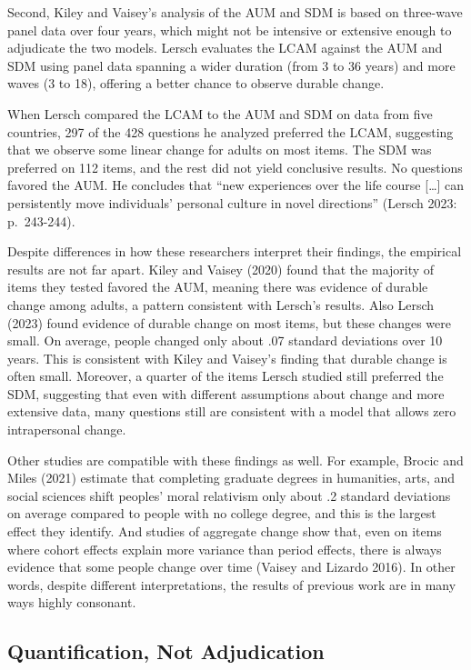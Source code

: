 \documentclass[
  12pt,
]{article}
\begin{document}
Second, Kiley and Vaisey's analysis of the AUM and SDM is based on
three-wave panel data over four years, which might not be intensive or
extensive enough to adjudicate the two models. Lersch evaluates the LCAM
against the AUM and SDM using panel data spanning a wider duration (from
3 to 36 years) and more waves (3 to 18), offering a better chance to
observe durable change.

When Lersch compared the LCAM to the AUM and SDM on data from five
countries, 297 of the 428 questions he analyzed preferred the LCAM,
suggesting that we observe some linear change for adults on most items.
The SDM was preferred on 112 items, and the rest did not yield
conclusive results. No questions favored the AUM. He concludes that
``new experiences over the life course {[}\ldots{]} can persistently
move individuals' personal culture in novel directions'' (Lersch 2023:
p.~243-244).

Despite differences in how these researchers interpret their findings,
the empirical results are not far apart. Kiley and Vaisey (2020) found
that the majority of items they tested favored the AUM, meaning there
was evidence of durable change among adults, a pattern consistent with
Lersch's results. Also Lersch (2023) found evidence of durable change on
most items, but these changes were small. On average, people changed
only about .07 standard deviations over 10 years. This is consistent
with Kiley and Vaisey's finding that durable change is often small.
Moreover, a quarter of the items Lersch studied still preferred the SDM,
suggesting that even with different assumptions about change and more
extensive data, many questions still are consistent with a model that
allows zero intrapersonal change.

Other studies are compatible with these findings as well. For example,
Brocic and Miles (2021) estimate that completing graduate degrees in
humanities, arts, and social sciences shift peoples' moral relativism
only about .2 standard deviations on average compared to people with no
college degree, and this is the largest effect they identify. And
studies of aggregate change show that, even on items where cohort
effects explain more variance than period effects, there is always
evidence that some people change over time (Vaisey and Lizardo 2016). In
other words, despite different interpretations, the results of previous
work are in many ways highly consonant.

\hypertarget{quantification-not-adjudication}{%
\subsection{Quantification, Not
Adjudication}\label{quantification-not-adjudication}}
\end{document}
